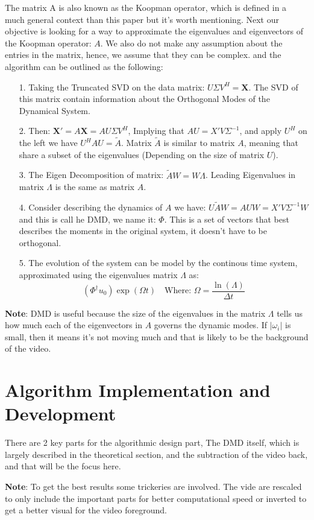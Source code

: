 \documentclass{article}
\begin{document}
        The matrix A is also known as the Koopman operator, which is defined in a much general context than this paper but it's worth mentioning. Next our objective is looking for a way to approximate the eigenvalues and eigenvectors of the Koopman operator: $A$. We also do not make any assumption about the entries in the matrix, hence, we assume that they can be complex. and the algorithm can be outlined as the following: 
        \begin{enumerate}
            \item[1.] Taking the Truncated SVD on the data matrix: $U\Sigma V^H = \mathbf{X}$. The SVD of this matrix contain information about the Orthogonal Modes of the Dynamical System. 
            \item[2.] Then: $\mathbf{X}' = A\mathbf{X} = AU\Sigma V^H$, Implying that $AU = X'V\Sigma^{-1}$, and apply $U^H$ on the left we have $U^HAU = \tilde{A}$. Matrix $\tilde{A}$ is similar to matrix $A$, meaning that share a subset of the eigenvalues (Depending on the size of matrix $U$). 
            \item[3.] The Eigen Decomposition of matrix: $\tilde{A}W = W\Lambda$. Leading Eigenvalues in matrix $\Lambda$ is the same as matrix $A$. 
            \item[4.] Consider describing the dynamics of $A$ we have: $U\tilde{A}W = AUW = X'V\Sigma^{-1}W$ and this is call he DMD, we name it: $\Phi$. This is a set of vectors that best describes the moments in the original system, it doesn't have to be orthogonal. 
            \item[5. ] The evolution of the system can be model by the continous time system, approximated using the eigenvalues matrix $\Lambda$ as: 
            \begin{equation*}\tag{4}\label{eqn:4}
                (\Phi^\dagger u_0)\exp(\Omega t)\quad\text{Where: } \Omega = \frac{\ln(\Lambda)}{\Delta t}
            \end{equation*}
        \end{enumerate}
        \textbf{Note}: DMD is useful because the size of the eigenvalues in the matrix $\Lambda$ tells us how much each of the eigenvectors in $A$ governs the dynamic modes. If $|\omega_i|$ is small, then it means it's not moving much and that is likely to be the background of the video.


\section{Algorithm Implementation and Development}
    \hspace{1.1em}
    \par
    There are 2 key parts for the algorithmic design part, The DMD itself, which is largely described in the theoretical section, and the subtraction of the video back, and that will be the focus here. 
    \par
    \textbf{Note}: To get the best results some trickeries are involved. The vide are rescaled to only include the important parts for better computational speed or inverted to get a better visual for the video foreground.  
\end{document}

